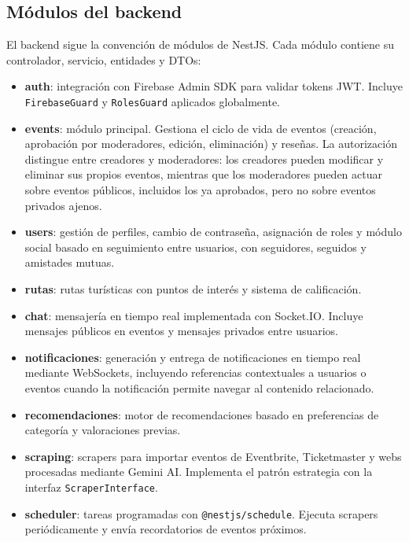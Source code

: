\subsection{Módulos del backend}

El backend sigue la convención de módulos de NestJS. Cada módulo contiene su controlador, servicio, entidades y DTOs:

\begin{itemize}
    \item \textbf{auth}: integración con Firebase Admin SDK para validar tokens JWT. Incluye \texttt{FirebaseGuard} y \texttt{RolesGuard} aplicados globalmente.
    \item \textbf{events}: módulo principal. Gestiona el ciclo de vida de eventos (creación, aprobación por moderadores, edición, eliminación) y reseñas. La autorización distingue entre creadores y moderadores: los creadores pueden modificar y eliminar sus propios eventos, mientras que los moderadores pueden actuar sobre eventos públicos, incluidos los ya aprobados, pero no sobre eventos privados ajenos.
    \item \textbf{users}: gestión de perfiles, cambio de contraseña, asignación de roles y módulo social basado en seguimiento entre usuarios, con seguidores, seguidos y amistades mutuas.
    \item \textbf{rutas}: rutas turísticas con puntos de interés y sistema de calificación.
    \item \textbf{chat}: mensajería en tiempo real implementada con Socket.IO. Incluye mensajes públicos en eventos y mensajes privados entre usuarios.
    \item \textbf{notificaciones}: generación y entrega de notificaciones en tiempo real mediante WebSockets, incluyendo referencias contextuales a usuarios o eventos cuando la notificación permite navegar al contenido relacionado.
    \item \textbf{recomendaciones}: motor de recomendaciones basado en preferencias de categoría y valoraciones previas.
    \item \textbf{scraping}: scrapers para importar eventos de Eventbrite, Ticketmaster y webs procesadas mediante Gemini AI. Implementa el patrón estrategia con la interfaz \texttt{ScraperInterface}.
    \item \textbf{scheduler}: tareas programadas con \texttt{@nestjs/schedule}. Ejecuta scrapers periódicamente y envía recordatorios de eventos próximos.
\end{itemize}

